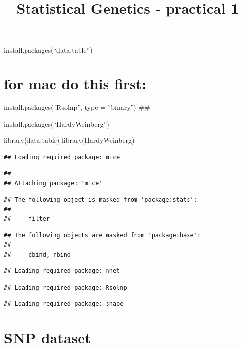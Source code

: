\documentclass[
]{article}
\title{Statistical Genetics - practical 1}
\author{}
\date{\vspace{-2.5em}}
\newenvironment{Shaded}{\begin{snugshade}}{\end{snugshade}}
\newcommand{\FunctionTok}[1]{\textcolor[rgb]{0.00,0.00,0.00}{#1}}
\newcommand{\NormalTok}[1]{#1}
\begin{document}
\maketitle

install.packages(``data.table'')

\hypertarget{for-mac-do-this-first}{%
\section{for mac do this first:}\label{for-mac-do-this-first}}

install.packages(``Rsolnp'', type = ``binary'') \#\#

install.packages(``HardyWeinberg'')

\begin{Shaded}
\begin{Highlighting}[]
\FunctionTok{library}\NormalTok{(data.table)}
\FunctionTok{library}\NormalTok{(HardyWeinberg)}
\end{Highlighting}
\end{Shaded}

\begin{verbatim}
## Loading required package: mice
\end{verbatim}

\begin{verbatim}
## 
## Attaching package: 'mice'
\end{verbatim}

\begin{verbatim}
## The following object is masked from 'package:stats':
## 
##     filter
\end{verbatim}

\begin{verbatim}
## The following objects are masked from 'package:base':
## 
##     cbind, rbind
\end{verbatim}

\begin{verbatim}
## Loading required package: nnet
\end{verbatim}

\begin{verbatim}
## Loading required package: Rsolnp
\end{verbatim}

\begin{verbatim}
## Loading required package: shape
\end{verbatim}

\hypertarget{snp-dataset}{%
\section{SNP dataset}\label{snp-dataset}}
\end{document}

